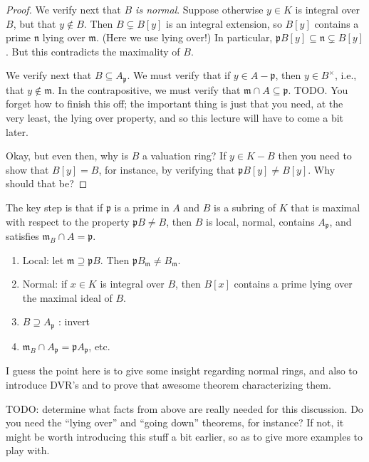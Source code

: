 \documentclass[10pt]{article}
\begin{document}
\begin{proof}
  We verify next that \emph{$B$ is normal}.
  Suppose otherwise $y \in K$ is integral over $B$,
  but that $y \notin B$.
  Then $B \subsetneq B[y]$ is an integral extension,
  so $B[y]$ contains a prime $\mathfrak{n}$ lying over
  $\mathfrak{m}$.
  (Here we use lying over!)
  In particular, $\mathfrak{p} B[y] \subseteq \mathfrak{n} \subsetneq B[y]$.
  But this contradicts the maximality of $B$.

  We verify next that $B \subseteq A_\mathfrak{p}$.
  We must verify that if $y \in A - \mathfrak{p}$,
  then $y \in B^\times$,
  i.e., that $y \notin \mathfrak{m}$.
  In the contrapositive,
  we must verify that
  $\mathfrak{m} \cap A \subseteq \mathfrak{p}$.
  TODO.  You forget how to finish this off; the important thing is just that
  you need, at the very least, the lying over property, and so this lecture
  will have to come a bit later.

  Okay, but even then, why is $B$ a valuation ring?
  If $y \in K - B$
  then you need to show that $B[y] = B$,
  for instance, by verifying that
  $\mathfrak{p} B[y] \neq B[y]$.
  Why should that be?
\end{proof}
The key step is that if \(\mathfrak{p}\) is a prime in \(A\) and \(B\)
is a subring of \(K\) that is maximal with respect to the property
\(\mathfrak{p} B \neq B\), then \(B\) is local, normal, contains
\(A_\mathfrak{p}\), and satisfies
\(\mathfrak{m}_B \cap A = \mathfrak{p}\).

\begin{enumerate}
\item Local: let $\mathfrak{m} \supseteq \mathfrak{p} B$.
  Then $\mathfrak{p} B_\mathfrak{m} \neq B_\mathfrak{m}$.
\item
  Normal: if $x \in K$ is integral over $B$, then $B[x]$
  contains a prime lying over the maximal ideal of $B$.
\item $B \supseteq A_\mathfrak{p}$ : invert
\item
  $\mathfrak{m}_B \cap A_\mathfrak{p} = \mathfrak{p}
  A_\mathfrak{p}$, etc.
\end{enumerate}
I guess the point here is to give some insight regarding normal rings, and also
to introduce DVR's and to prove that awesome theorem
characterizing them.

TODO: determine what facts from above are really needed
for this discussion.
Do you need the ``lying over'' and ``going down'' theorems,
for instance?
If not, it might be worth introducing
this stuff a bit earlier,
so as to give more examples to play with.
\end{document}
